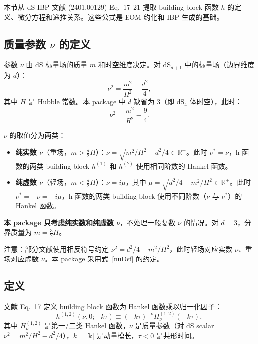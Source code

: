 ﻿\documentclass[a4paper,11pt]{article}
\begin{document}
本节从 dS IBP 文献 (2401.00129) Eq.~17--21 提取 building block 函数 $h$ 的定义、微分方程和递推关系。这些公式是 EOM 约化和 IBP 生成的基础。

\subsection{质量参数 $\nu$ 的定义}

参数 $\nu$ 由 dS 标量场的质量 $m$ 和时空维度决定。对 $\text{dS}_{d+1}$ 中的标量场（边界维度为 $d$）：
\begin{equation}
  \nu^2 = \frac{m^2}{H^2} - \frac{d^2}{4},
  \label{nuDef}
\end{equation}
其中 $H$ 是 Hubble 常数。本 package 中 $d$ 缺省为 $3$（即 $\text{dS}_4$ 体时空），此时：
\begin{equation}
  \nu^2 = \frac{m^2}{H^2} - \frac{9}{4}.
  \label{nuDef3d}
\end{equation}

$\nu$ 的取值分为两类：
\begin{itemize}
  \item \textbf{纯实数 $\nu$}（重场，$m > \frac{d}{2}H$）：$\nu = \sqrt{m^2/H^2 - d^2/4} \in \mathbb{R}^+$。此时 $\nu^* = \nu$，h 函数的两类 building block $h^{(1)}$ 和 $h^{(2)}$ 使用相同阶数的 Hankel 函数。
  \item \textbf{纯虚数 $\nu$}（轻场，$m < \frac{d}{2}H$）：$\nu = i\mu$，其中 $\mu = \sqrt{d^2/4 - m^2/H^2} \in \mathbb{R}^+$。此时 $\nu^* = -\nu = -i\mu$，h 函数的两类 building block 使用不同阶数（$\nu$ 与 $\nu^*$）的 Hankel 函数。
\end{itemize}

\textbf{本 package 只考虑纯实数和纯虚数 $\nu$}，不处理一般复数 $\nu$ 的情况。对 $d=3$，分界质量为 $m = \frac{3}{2}H$。

注意：部分文献使用相反符号约定 $\nu^2 = d^2/4 - m^2/H^2$，此时轻场对应实数 $\nu$、重场对应虚数 $\nu$。本 package 采用式~\eqref{nuDef} 的约定。

\subsection{定义}

文献 Eq.~17 定义 building block 函数为 Hankel 函数乘以归一化因子：
\begin{equation}
  h^{(1,2)}(\nu, 0; -k\tau) \equiv (-k\tau)^{-\nu} H_\nu^{(1,2)}(-k\tau),
  \label{hdef0}
\end{equation}
其中 $H_\nu^{(1,2)}$ 是第一/二类 Hankel 函数，$\nu$ 是质量参数（对 dS scalar $\nu^2 = m^2/H^2 - d^2/4$），$k = |\boldsymbol{k}|$ 是动量模长，$\tau < 0$ 是共形时间。
\end{document}
